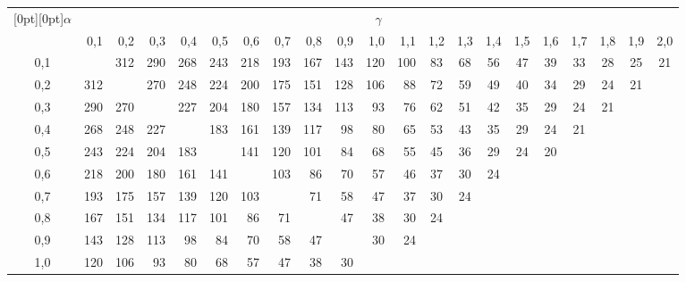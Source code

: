 \begin{table}\small


\begin{center}




\vspace*{2ex}





\tabcolsep=1.2pt


\begin{tabular}{|c|r|r|r|r|r|r|r|r|r|r|r|c|c|c|c|c|c|c|c|c|}


\hline


\multicolumn{1}{|c|}{\raisebox{-6pt}[0pt][0pt]{$\alpha$}}&\multicolumn{20}{c|}{$\gamma$}\\


\cline{2-21}


&0,1&0,2&0,3&0,4&0,5&0,6&0,7&0,8&0,9&1,0&1,1&1,2&1,3&1,4&1,5&1,6&1,7&1,8&1,9&2,0\\


\hline


0,1&&312&290&268&243&218&193&167&143&120&100&83&68&56&47&39&33&28&25&21\\


0,2&312&&270&248&224&200&175&151&128&106&88&72&59&49&40&34&29&24&21&\\


0,3&290&270&&227&204&180&157&134&113&93&76&62&51&42&35&29&24&21&&\\


0,4&268&248&227&&183&161&139&117&98&80&65&53&43&35&29&24&21&&&\\


0,5&243&224&204&183&&141&120&101&84&68&55&45&36&29&24&20&&&&\\


0,6&218&200&180&161&141&&103&86&70&57&46&37&30&24&&&&&&\\


0,7&193&175&157&139&120&103&&71&58&47&37&30&24&&&&&&&\\


0,8&167&151&134&117&101&86&71&&47&38&30&24&&&&&&&&\\


0,9&143&128&113&98&84&70&58&47&&30&24&&&&&&&&&\\


1,0&120&106&93&80&68&57&47&38&30&&&&&&&&&&&\\



\end{tabular}
\end{center}
\end{table}
